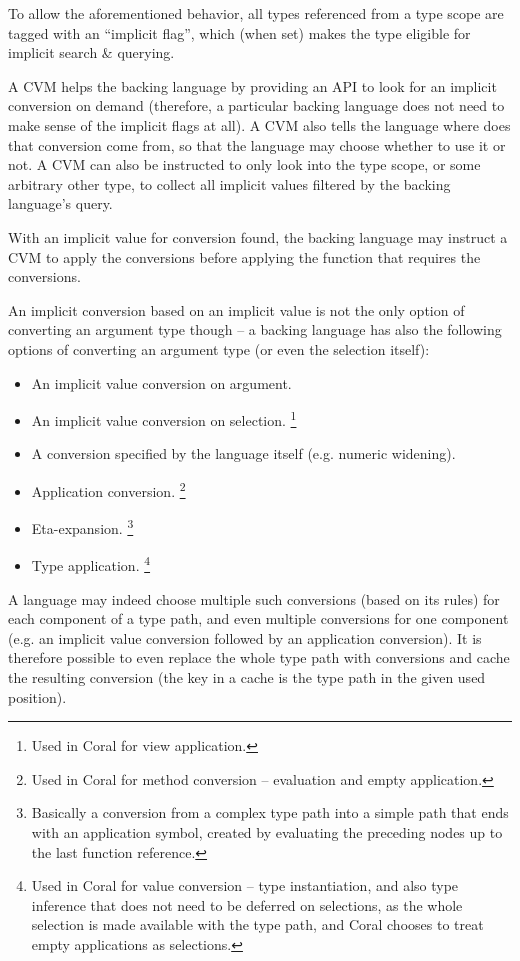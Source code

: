 To allow the aforementioned behavior, all types referenced from a type scope are tagged with an ``implicit flag'', which (when set) makes the type eligible for implicit search \& querying. 

A CVM helps the backing language by providing an API to look for an implicit conversion on demand (therefore, a particular backing language does not need to make sense of the implicit flags at all). A CVM also tells the language where does that conversion come from, so that the language may choose whether to use it or not. A CVM can also be instructed to only look into the type scope, or some arbitrary other type, to collect all implicit values filtered by the backing language's query. 

With an implicit value for conversion found, the backing language may instruct a CVM to apply the conversions before applying the function that requires the conversions. 

An implicit conversion based on an implicit value is not the only option of converting an argument type though -- a backing language has also the following options of converting an argument type (or even the selection itself): 

\begin{itemize}
\item An implicit value conversion on argument. 
\item An implicit value conversion on selection. \footnote{Used in Coral for view application.}
\item A conversion specified by the language itself (e.g. numeric widening). 
\item Application conversion. \footnote{Used in Coral for method conversion -- evaluation and empty application.}
\item Eta-expansion. \footnote{Basically a conversion from a complex type path into a simple path that ends with an application symbol, created by evaluating the preceding nodes up to the last function reference.}
\item Type application. \footnote{Used in Coral for value conversion -- type instantiation, and also type inference that does not need to be deferred on selections, as the whole selection is made available with the type path, and Coral chooses to treat empty applications as selections.}
\end{itemize}

A language may indeed choose multiple such conversions (based on its rules) for each component of a type path, and even multiple conversions for one component (e.g. an implicit value conversion followed by an application conversion). It is therefore possible to even replace the whole type path with conversions and cache the resulting conversion (the key in a cache is the type path in the given used position). 

